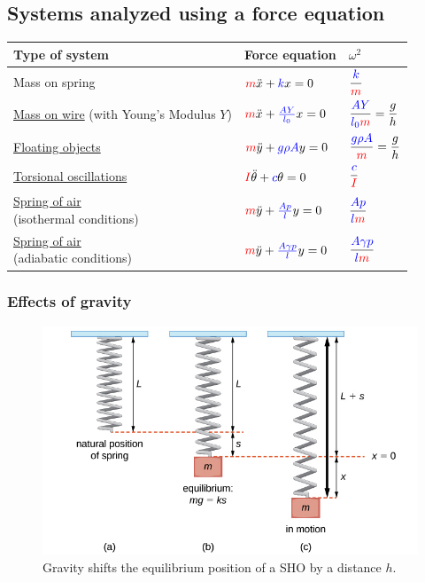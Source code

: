 \subsection{Systems analyzed using a force equation}
\begin{center}
	\renewcommand{\arraystretch}{2.5}
\begin{tabular}{lll}
	\hline
	Type of system & Force equation & $\omega^2$ \\ \hline
	Mass on spring &
		$\textcolor{red}{m}\ddot{x} + \textcolor{blue}{k}x = 0$ &
		$\dfrac{\textcolor{blue}{k}}{\textcolor{red}{m}}$
		\\
	\parbox{4cm}{\hyperref[ch3:sec-wire]{Mass on wire} \\\footnotesize{(with Young's Modulus $Y$)}} &
		$\textcolor{red}{m}\ddot{x} + \textcolor{blue}{\frac{AY}{l_0}}x = 0$ &
		$\dfrac{\textcolor{blue}{AY}}{\textcolor{blue}{l_0}\textcolor{red}{m}} = \dfrac{g}{h}$ 
		\\
	\hyperref[ch3:sec-floating]{Floating objects} &
		$\textcolor{red}{m}\ddot{y} + \textcolor{blue}{g\rho A}y = 0$ &
		$\dfrac{\textcolor{blue}{g\rho A}}{\textcolor{red}{m}} = \dfrac{g}{h}$ 
		\\
	\hyperref[ch3:sec-torsional]{Torsional oscillations} &
		$\textcolor{red}{I}\ddot{\theta} + \textcolor{blue}{c}\theta = 0$ &
		$\dfrac{\textcolor{blue}{c}}{\textcolor{red}{I}}$ 
		\\
	\parbox{3.5cm}{\hyperref[ch3:sec-air]{Spring of air} \\\footnotesize{(isothermal conditions)}} &
		$\textcolor{red}{m}\ddot{y} + \textcolor{blue}{\frac{Ap}{l}}y = 0$ &
		$\dfrac{\textcolor{blue}{Ap}}{\textcolor{blue}{l}\textcolor{red}{m}}$ 
		\\
	\parbox{3.5cm}{\hyperref[ch3:sec-air]{Spring of air} \\\footnotesize{(adiabatic conditions)}} &
		$\textcolor{red}{m}\ddot{y} + \textcolor{blue}{\frac{A\gamma p}{l}}y = 0$ &
		$\dfrac{\textcolor{blue}{A\gamma p}}{\textcolor{blue}{l}\textcolor{red}{m}}$ 
		\\
	\hline
\end{tabular}
\renewcommand{\arraystretch}{1}
\end{center}


\subsubsection{Effects of gravity}

\begin{figure}[h]
	\centering
	\includegraphics[scale=0.4]{phys232/Ch3-g-new-eqm} \caption{Gravity shifts the equilibrium position of a SHO by a distance $h$.}\label{ch3:fig-g-new-eqm-pos}
\end{figure}

